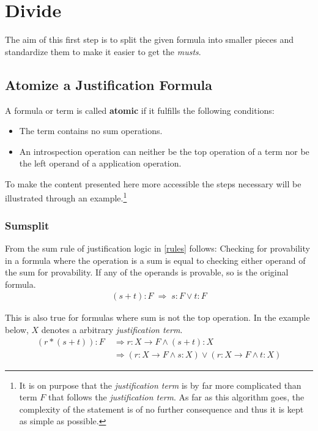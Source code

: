 \section{Divide}\label{chap:Algorithm.divide}
The aim of this first step is to split the given formula into smaller pieces and standardize them to make it easier to get the \emph{musts}.

\subsection{Atomize a Justification Formula}\label{chap:Algorithm.atomize}
\begin{definition}[atomic]
	A formula or term is called \textbf{atomic} if it fulfills the following conditions:
	\begin{itemize}
		\item The term contains no sum operations.
		\item An introspection operation can neither be the top operation of a term nor be the left operand of a application operation.
	\end{itemize}	
\end{definition}
To make the content presented here more accessible the steps necessary will be illustrated through an example.\footnote{It is on purpose that the \emph{justification term} is by far more complicated than term $F$ that follows the \emph{justification term}. As far as this algorithm goes, the complexity of the statement is of no further consequence and thus it is kept as simple as possible.}

\subsubsection{Sumsplit}
\label{sumsplit}
From the sum rule of justification logic in \ref{rules} follows: Checking for provability in a formula where the operation is a sum is equal to checking either operand of the sum for provability. If any of the operands is provable, so is the original formula.
\begin{align}\label{ss1}
	(s+t):F \; \Rightarrow \; s:F \lor t:F
\end{align}



This is also true for formulas where sum is not the top operation. In the example below, $X$ denotes a arbitrary \emph{justification term}.
\begin{align}\label{ss2}
	(r*(s+t)):F  \; & \Rightarrow r: X \rightarrow F \land (s+t): X \\
	& \Rightarrow ( r: X \rightarrow F \land s: X ) \lor ( r: X \rightarrow F \land t: X )
\end{align}

